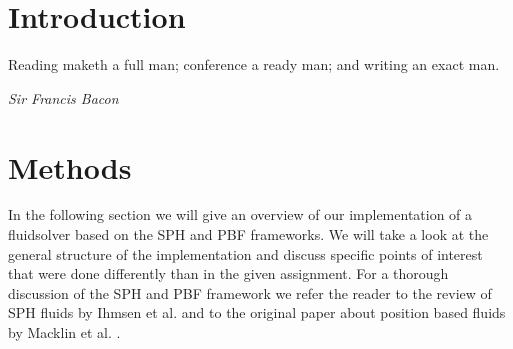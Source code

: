 \documentclass[11pt, letterpaper, twocolumn]{article}
\begin{document}


\section{Introduction} \label{sec:introduction}

\epigraph{Reading maketh a full man; conference a ready man; and writing an exact man.}
{\textit{Sir Francis Bacon}}


\section{Methods} \label{sec:methods}

In the following section we will give an overview of our implementation of a fluidsolver based on the SPH and PBF frameworks.
We will take a look at the general structure of the implementation and discuss specific points of interest that were done differently than in the given assignment.
For a thorough discussion of the SPH and PBF framework we refer the reader to the review of SPH fluids by Ihmsen et al. \cite{ihmsen2014} and to the original paper about position based fluids by Macklin et al. \cite{macklin2013}.
\end{document}
